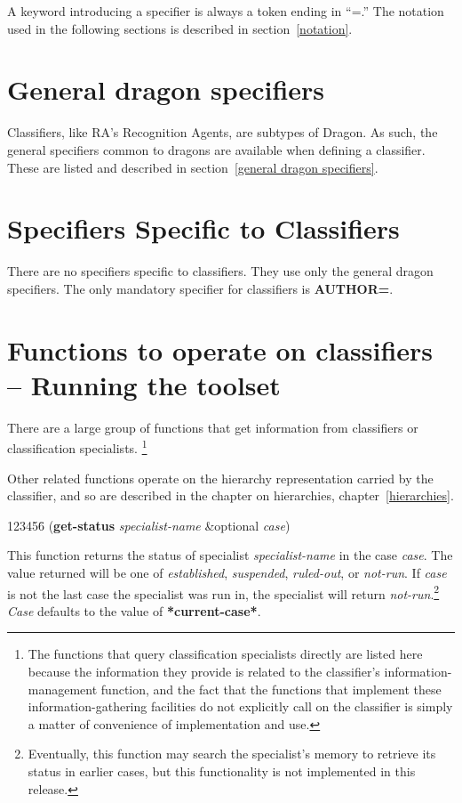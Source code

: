 A keyword introducing a specifier is always a token ending in ``=.''
The notation used in the following sections is described in
section~\ref{notation}.


\section{General dragon specifiers}

Classifiers, like RA's Recognition Agents, are subtypes of Dragon. As
such, the general specifiers common to dragons are available when
defining a classifier.  These are listed and described in
section~\ref{general dragon specifiers}.

\section{Specifiers Specific to Classifiers}

There are no specifiers specific to classifiers. They use only the
general dragon specifiers. The only mandatory specifier for
classifiers is {\bf AUTHOR=}.


\section{Functions to operate on classifiers -- Running the toolset}

There are a large group of functions that get information from
classifiers or classification specialists. \footnote{The functions
that query classification specialists directly are listed here because
the information they provide is related to the classifier's
information-management function, and the fact that the functions that
implement these information-gathering facilities do not explicitly
call on the classifier is simply a matter of convenience of
implementation and use.}

Other related functions operate on the hierarchy representation
carried by the classifier, and so are described in the chapter on
hierarchies, chapter~\ref{hierarchies}.


\begin{tabbing}
123456\= \kill
({\bf get-status} {\it specialist-name\/} \&optional {\it case\/}) 
\end{tabbing}
This function returns the status of specialist {\it specialist-name\/}
in the case {\it case\/}. The value returned will be one of {\it
established\/}, {\it suspended\/}, {\it ruled-out\/}, or {\it
not-run\/}. If {\it case} is not the last case the specialist was run
in, the specialist will return {\it not-run\/}.\footnote{Eventually,
this function may search the specialist's memory to retrieve its
status in earlier cases, but this functionality is not implemented in
this release.} {\it Case} defaults to the value of {\bf
*current-case*}.

